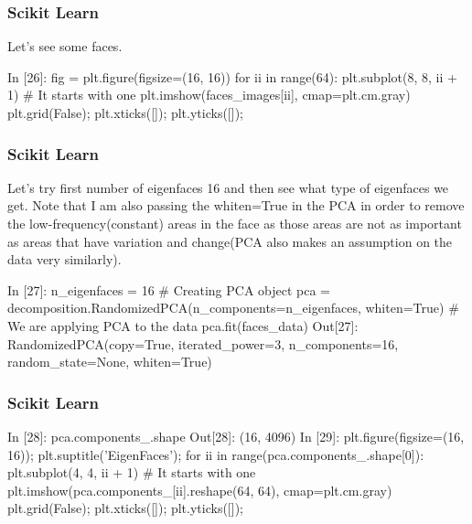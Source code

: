 \begin{frame}[fragile]
	\frametitle{Scikit Learn}
Let's see some faces.

In [26]:
fig = plt.figure(figsize=(16, 16))
for ii in range(64):
    plt.subplot(8, 8, ii + 1) # It starts with one
    plt.imshow(faces_images[ii], cmap=plt.cm.gray)
    plt.grid(False);
    plt.xticks([]);
    plt.yticks([]);
\end{frame}
\begin{frame}[fragile]
	\frametitle{Scikit Learn}
Let's try first number of eigenfaces 16 and then see what type of eigenfaces we get. Note that I am also passing the whiten=True in the PCA in order to remove the low-frequency(constant) areas in the face as those areas are not as important as areas that have variation and change(PCA also makes an assumption on the data very similarly).

In [27]:
n_eigenfaces = 16
# Creating PCA object
pca = decomposition.RandomizedPCA(n_components=n_eigenfaces, whiten=True)
# We are applying PCA to the data
pca.fit(faces_data)
Out[27]:
RandomizedPCA(copy=True, iterated_power=3, n_components=16, random_state=None,
       whiten=True)
\end{frame}
\begin{frame}[fragile]
	\frametitle{Scikit Learn}
In [28]:
pca.components_.shape
Out[28]:
(16, 4096)
In [29]:
plt.figure(figsize=(16, 16));
plt.suptitle('EigenFaces');
for ii in range(pca.components_.shape[0]):
    plt.subplot(4, 4, ii + 1) # It starts with one
    plt.imshow(pca.components_[ii].reshape(64, 64), cmap=plt.cm.gray)
    plt.grid(False);
    plt.xticks([]);
    plt.yticks([]);
\end{frame}
